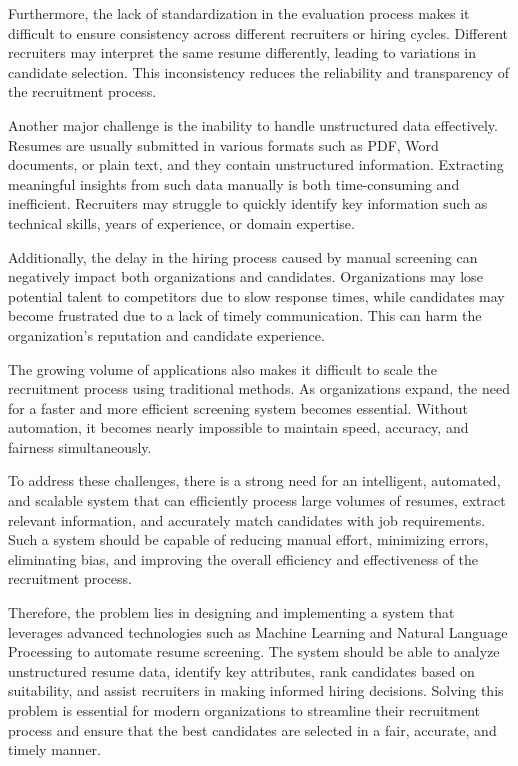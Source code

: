 \vspace{6pt}
{%
Furthermore, the lack of standardization in the evaluation process makes it difficult to ensure consistency across different recruiters or hiring cycles. Different recruiters may interpret the same resume differently, leading to variations in candidate selection. This inconsistency reduces the reliability and transparency of the recruitment process.}

\vspace{6pt}
{%
Another major challenge is the inability to handle unstructured data effectively. Resumes are usually submitted in various formats such as PDF, Word documents, or plain text, and they contain unstructured information. Extracting meaningful insights from such data manually is both time-consuming and inefficient. Recruiters may struggle to quickly identify key information such as technical skills, years of experience, or domain expertise.}

\vspace{6pt}
{%
Additionally, the delay in the hiring process caused by manual screening can negatively impact both organizations and candidates. Organizations may lose potential talent to competitors due to slow response times, while candidates may become frustrated due to a lack of timely communication. This can harm the organization’s reputation and candidate experience.}


\vspace{6pt}
{%
The growing volume of applications also makes it difficult to scale the recruitment process using traditional methods. As organizations expand, the need for a faster and more efficient screening system becomes essential. Without automation, it becomes nearly impossible to maintain speed, accuracy, and fairness simultaneously.}


\vspace{6pt}
{%
To address these challenges, there is a strong need for an intelligent, automated, and scalable system that can efficiently process large volumes of resumes, extract relevant information, and accurately match candidates with job requirements. Such a system should be capable of reducing manual effort, minimizing errors, eliminating bias, and improving the overall efficiency and effectiveness of the recruitment process.}


\vspace{6pt}
{%
Therefore, the problem lies in designing and implementing a system that leverages advanced technologies such as Machine Learning and Natural Language Processing to automate resume screening. The system should be able to analyze unstructured resume data, identify key attributes, rank candidates based on suitability, and assist recruiters in making informed hiring decisions. Solving this problem is essential for modern organizations to streamline their recruitment process and ensure that the best candidates are selected in a fair, accurate, and timely manner.}

